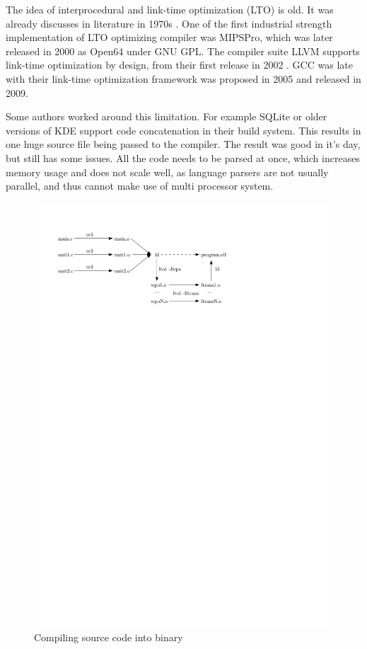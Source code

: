 The idea of interprocedural and link-time optimization (LTO) is old. 
It was already discusses in literature in 1970s \cite{Allen:1974,Allen:1976}.
One of the first industrial strength implementation of LTO optimizing compiler
was MIPSPro, which was later released in 2000 as Open64 under GNU GPL. The
compiler suite LLVM supports link-time optimization by design, from their first
release in 2002 \cite{lattner2002llvm}.  GCC was late with their link-time
optimization framework was proposed in 2005 \cite{gcclto,briggs2007whopr} and
released in 2009.

Some authors worked around this limitation. For example SQLite or older versions
of KDE support code concatenation in their build system. This results in one
huge source file being passed to the compiler. The result was good in it's day,
but still has some issues. All the code needs to be parsed at once, which
increases memory usage and does not scale well, as language parsers are not
usually parallel, and thus cannot make use of multi processor system.

\begin{figure}[h!]
	\label{figure-lto-workflow}
	\centering
	\includegraphics{./img/lto-workflow.pdf}
	\caption{Compiling source code into binary}
\end{figure}

